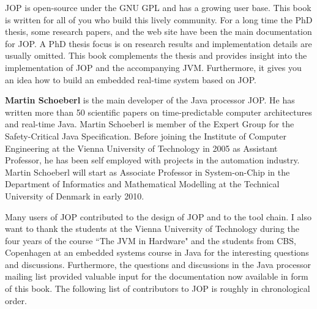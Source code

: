 JOP is open-source under the GNU GPL and has a growing user base.
This book is written for all of you who build this lively community.
For a long time the PhD thesis, some research papers, and the web
site have been the main documentation for JOP. A PhD thesis focus is
on research results and implementation details are usually omitted.
This book complements the thesis and provides insight into the
implementation of JOP and the accompanying JVM. Furthermore, it gives
you an idea how to build an embedded real-time system based on JOP.

\textbf{Martin Schoeberl} is the main developer of the Java processor
JOP. He has written more than 50 scientific papers on
time-predictable computer architectures and real-time Java. Martin
Schoeberl is member of the Expert Group for the Safety-Critical Java
Specification. Before joining the Institute of Computer Engineering
at the Vienna University of Technology in 2005 as Assistant
Professor, he has been self employed with projects in the automation
industry. Martin Schoeberl will start as Associate Professor in
System-on-Chip in the Department of Informatics and Mathematical
Modelling at the Technical University of Denmark in early 2010.


Many users of JOP contributed to the design of JOP and to the tool
chain. I also want to thank the students at the Vienna University of
Technology during the four years of the course ``The JVM in Hardware"
and the students from CBS, Copenhagen at an embedded systems course
in Java for the interesting questions and discussions. Furthermore,
the questions and discussions in the Java processor mailing list
provided valuable input for the documentation now available in form
of this book. The following list of contributors to JOP is roughly in
chronological order.

